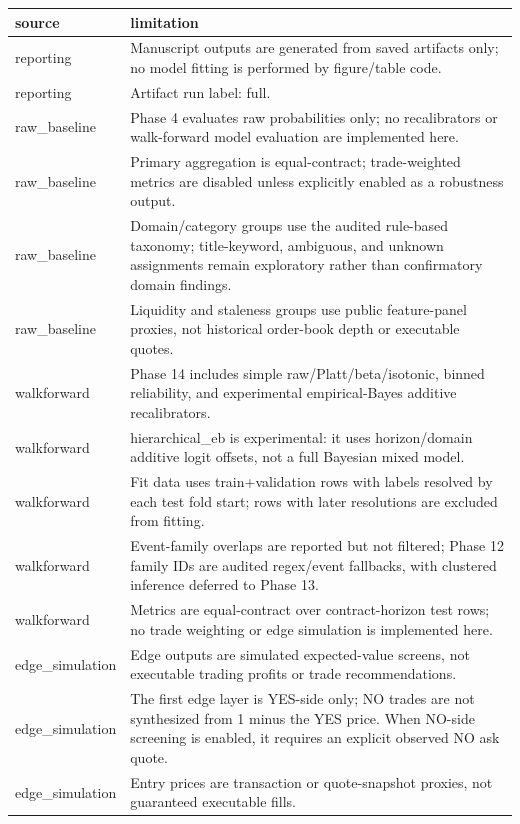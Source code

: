 \begin{tabular}{ll}
\toprule
source & limitation \\
\midrule
reporting & Manuscript outputs are generated from saved artifacts only; no model fitting is performed by figure/table code. \\
reporting & Artifact run label: full. \\
raw\_baseline & Phase 4 evaluates raw probabilities only; no recalibrators or walk-forward model evaluation are implemented here. \\
raw\_baseline & Primary aggregation is equal-contract; trade-weighted metrics are disabled unless explicitly enabled as a robustness output. \\
raw\_baseline & Domain/category groups use the audited rule-based taxonomy; title-keyword, ambiguous, and unknown assignments remain exploratory rather than confirmatory domain findings. \\
raw\_baseline & Liquidity and staleness groups use public feature-panel proxies, not historical order-book depth or executable quotes. \\
walkforward & Phase 14 includes simple raw/Platt/beta/isotonic, binned reliability, and experimental empirical-Bayes additive recalibrators. \\
walkforward & hierarchical\_eb is experimental: it uses horizon/domain additive logit offsets, not a full Bayesian mixed model. \\
walkforward & Fit data uses train+validation rows with labels resolved by each test fold start; rows with later resolutions are excluded from fitting. \\
walkforward & Event-family overlaps are reported but not filtered; Phase 12 family IDs are audited regex/event fallbacks, with clustered inference deferred to Phase 13. \\
walkforward & Metrics are equal-contract over contract-horizon test rows; no trade weighting or edge simulation is implemented here. \\
edge\_simulation & Edge outputs are simulated expected-value screens, not executable trading profits or trade recommendations. \\
edge\_simulation & The first edge layer is YES-side only; NO trades are not synthesized from 1 minus the YES price. When NO-side screening is enabled, it requires an explicit observed NO ask quote. \\
edge\_simulation & Entry prices are transaction or quote-snapshot proxies, not guaranteed executable fills. \\

\end{tabular}
